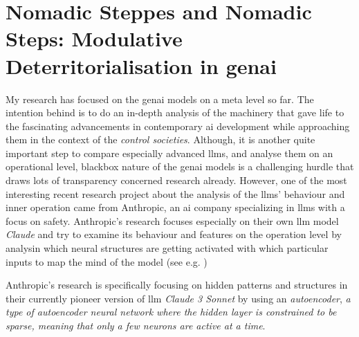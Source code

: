 \section{Nomadic Steppes and Nomadic Steps: Modulative Deterritorialisation in
  \Gls{genai} }


My research has focused on the \gls{genai} models on a meta level so far. The
intention behind is to do an in-depth analysis of the machinery that gave life
to the fascinating advancements in contemporary \gls{ai} development while
approaching them in the context of the \textit{control societies}. Although, it
is another quite important step to compare especially advanced \glspl{llm}, and
analyse them on an operational level, blackbox nature of the \gls{genai} models
is a challenging hurdle that draws lots of transparency concerned research
already. However, one of the most interesting recent research project about the
analysis of the \glspl{llm}' behaviour and inner operation came from
Anthropic,
an \gls{ai} company specializing in \glspl{llm} with a focus on safety.
Anthropic's research focuses especially on their own \gls{llm} model \textit{Claude} and try to examine its behaviour and features on the operation level by analysin which neural structures are getting activated with which particular inputs to map the mind of the model (see e.g. \cite[]{templeton2024, lindsey2024, ameisen2025}) 

Anthropic's research  \parencite[]{templeton2024} is
specifically focusing on hidden patterns and structures in their currently
pioneer version of \gls{llm} \textit{Claude 3 Sonnet} by using an
\textit{autoencoder}, \textit{a type of autoencoder neural network where the hidden layer is constrained to be sparse, meaning that only a few neurons are active at a time}\parencite[]{mcgraw2024}. 





